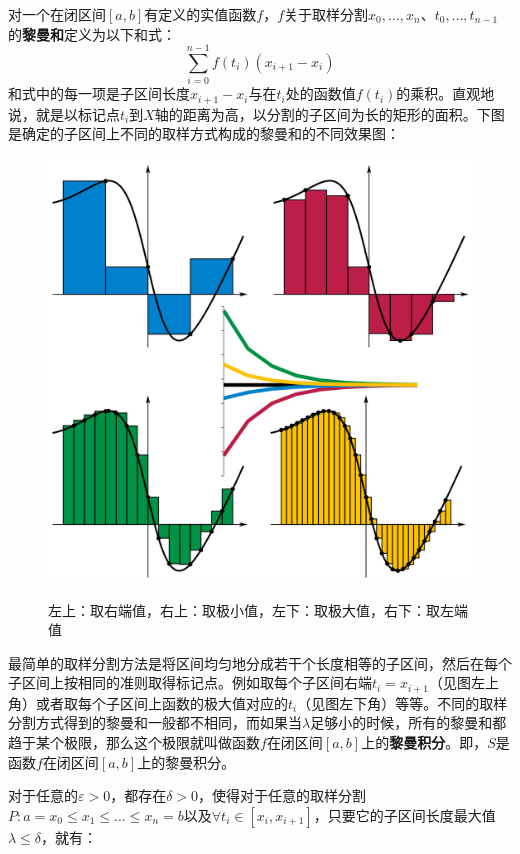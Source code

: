 \documentclass[UTF8]{ctexart}
\begin{document}
{对一个在闭区间$[a,b]$有定义的实值函数$f$，$f$关于取样分割$x_{0},\ldots ,x_{n}$、$t_{0},\ldots ,t_{n-1}$的\textbf{黎曼和}定义为以下和式：
\begin{equation}
	\sum _{i=0}^{n-1}f(t_{i})(x_{i+1}-x_{i})
\end{equation}
和式中的每一项是子区间长度$x_{i+1}-x_{i}$与在$t_{i}$处的函数值$f(t_{i})$的乘积。直观地说，就是以标记点$t_{i}$到$X$轴的距离为高，以分割的子区间为长的矩形的面积。下图是确定的子区间上不同的取样方式构成的黎曼和的不同效果图：
\begin{figure}[H]
  \centering
  \includegraphics[scale=0.65]{Integral.png}\\
  \caption{左上：取右端值，右上：取极小值，左下：取极大值，右下：取左端值}
\end{figure}
最简单的取样分割方法是将区间均匀地分成若干个长度相等的子区间，然后在每个子区间上按相同的准则取得标记点。例如取每个子区间右端$t_i =x_{i+1}$（见图左上角）或者取每个子区间上函数的极大值对应的$t_{i}$（见图左下角）等等。不同的取样分割方式得到的黎曼和一般都不相同，而如果当$\lambda$足够小的时候，所有的黎曼和都趋于某个极限，那么这个极限就叫做函数$f$在闭区间$[a,b]$上的\textbf{黎曼积分}。即，$S$是函数$f$在闭区间$[a,b]$上的黎曼积分。
\begin{question}
对于任意的$\varepsilon >0$，都存在$\delta >0$，使得对于任意的取样分割$P:a = x_{0} \leqslant x_1 \leqslant \ldots \leqslant x_{n}=b$以及$\forall t_{i} \in [x_i, x_{i+1}]$，只要它的子区间长度最大值$\lambda \leqslant \delta$，就有：

\end{question}}
\end{document}
